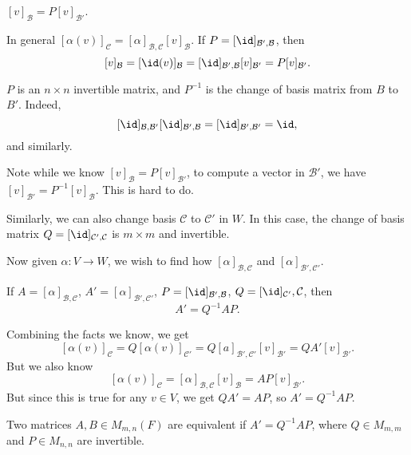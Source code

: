 \documentclass[12pt]{article}
\begin{document}
\begin{lemma}
	$[v]_{\mathcal{B}} = P[v]_{\mathcal{B}'}$.
\end{lemma}

\begin{proofbox}
	In general $[\alpha(v)]_{\mathcal{C}} = [\alpha]_{\mathcal{B}, \mathcal{C}} [v]_{\mathcal{B}}$. If $P = [\id]_{\mathcal{B}', \mathcal{B}}$, then
	\[
		[v]_{\mathcal{B}} = [\id(v)]_{\mathcal{B}} = [\id]_{\mathcal{B}', \mathcal{B}} [v]_{\mathcal{B}'} = P[v]_{\mathcal{B}'}
	.\]
\end{proofbox}

\begin{remark} 
	$P$ is an $n \times n$ invertible matrix, and $P^{-1}$ is the change of basis matrix from $B$ to $B'$. Indeed,
	\[
		[\id]_{\mathcal{B}, \mathcal{B}'} [\id]_{\mathcal{B}', \mathcal{B}} = [\id]_{\mathcal{B}', \mathcal{B}'} = \id
	,\]
	and similarly.
\end{remark}

Note while we know $[v]_{\mathcal{B}} = P [v]_{\mathcal{B}'}$, to compute a vector in $\mathcal{B}'$, we have $[v]_{\mathcal{B}'} = P^{-1}[v]_{\mathcal{B}}$. This is hard to do.

Similarly, we can also change basis $\mathcal{C}$ to $\mathcal{C}'$ in $W$. In this case, the change of basis matrix $Q = [\id]_{\mathcal{C}', \mathcal{C}}$ is $m \times m$ and invertible.

Now given $\alpha : V \to W$, we wish to find how $[\alpha]_{\mathcal{B}, \mathcal{C}}$ and $[\alpha]_{\mathcal{B}', \mathcal{C}'}$.

\begin{proposition}
	If $A = [\alpha]_{\mathcal{B}, \mathcal{C}}$, $A' = [\alpha]_{\mathcal{B}', \mathcal{C}'}$, $P = [\id]_{\mathcal{B}', \mathcal{B}}$, $Q = [\id]_{\mathcal{C}'}, \mathcal{C}$, then
	\[
	A' = Q^{-1}AP
	.\]
\end{proposition}

\begin{proofbox}
	Combining the facts we know, we get
\[
	[\alpha(v)]_{\mathcal{C}} = Q[\alpha(v)]_{\mathcal{C}'} = Q[a]_{\mathcal{B}', \mathcal{C}'} [v]_{\mathcal{B}'} = Q A' [v]_{\mathcal{B}'}.
\]
But we also know
\[
	[\alpha(v)]_{\mathcal{C}} = [\alpha]_{\mathcal{B}, \mathcal{C}}[v]_{\mathcal{B}} = A P [v]_{\mathcal{B}'}
.\]
But since this is true for any $v \in V$, we get $QA' = AP$, so $A' = Q^{-1}AP$.
\end{proofbox}

\begin{definition}
	Two matrices $A, B \in M_{m, n}(F)$ are equivalent if $A' = Q^{-1}AP$, where $Q \in M_{m, m}$ and $P \in M_{n, n}$ are invertible.
\end{definition}
\end{document}
